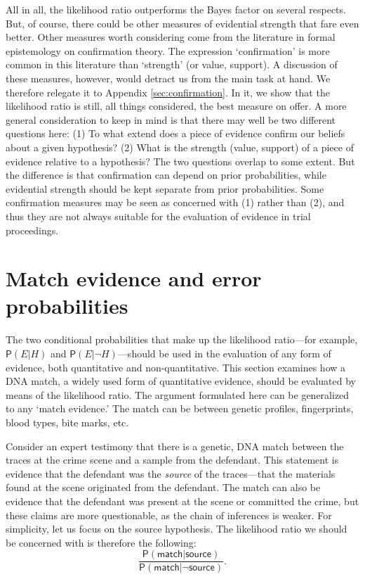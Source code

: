 \documentclass[
  10pt,
  dvipsnames,enabledeprecatedfontcommands]{scrartcl}
\newcommand{\pr}[1]{\mathsf{P}(#1)}
\begin{document}
\normalsize

All in all, the likelihood ratio outperforms the Bayes factor on several
respects. But, of course, there could be other measures of evidential
strength that fare even better. Other measures worth considering come
from the literature in formal epistemology on confirmation theory. The
expression `confirmation' is more common in this literature than
`strength' (or value, support). A discussion of these measures, however,
would detract us from the main task at hand. We therefore relegate it to
Appendix \ref{sec:confirmation}. In it, we show that the likelihood
ratio is still, all things considered, the best measure on offer. A more
general consideration to keep in mind is that there may well be two
different questions here: (1) To what extend does a piece of evidence
confirm our beliefs about a given hypothesis? (2) What is the strength
(value, support) of a piece of evidence relative to a hypothesis? The
two questions overlap to some extent. But the difference is that
confirmation can depend on prior probabilities, while evidential
strength should be kept separate from prior probabilities. Some
confirmation measures may be seen as concerned with (1) rather than (2),
and thus they are not always suitable for the evaluation of evidence in
trial proceedings.

\hypertarget{match-evidence-and-error-probabilities}{%
\section{\texorpdfstring{Match evidence and error probabilities
\label{sec:fp}}{Match evidence and error probabilities }}\label{match-evidence-and-error-probabilities}}

The two conditional probabilities that make up the likelihood
ratio---for example, \(\pr{E \vert H}\) and
\(\pr{E \vert \neg H}\)---should be used in the evaluation of any form
of evidence, both quantitative and non-quantitative. This section
examines how a DNA match, a widely used form of quantitative evidence,
should be evaluated by means of the likelihood ratio. The argument
formulated here can be generalized to any `match evidence.' The match
can be between genetic profiles, fingerprints, blood types, bite marks,
etc.

Consider an expert testimony that there is a genetic, DNA match between
the traces at the crime scene and a sample from the defendant. This
statement is evidence that the defendant was the \textit{source} of the
traces---that the materials found at the scene originated from the
defendant. The match can also be evidence that the defendant was present
at the scene or committed the crime, but these claims are more
questionable, as the chain of inferences is weaker. For simplicity, let
us focus on the source hypothesis. The likelihood ratio we should be
concerned with is therefore the following:
\[\frac{\pr{\textsf{match} \vert \textsf{source}}}{\pr{\textsf{match} \vert \neg \textsf{source}}}.\]
\end{document}
